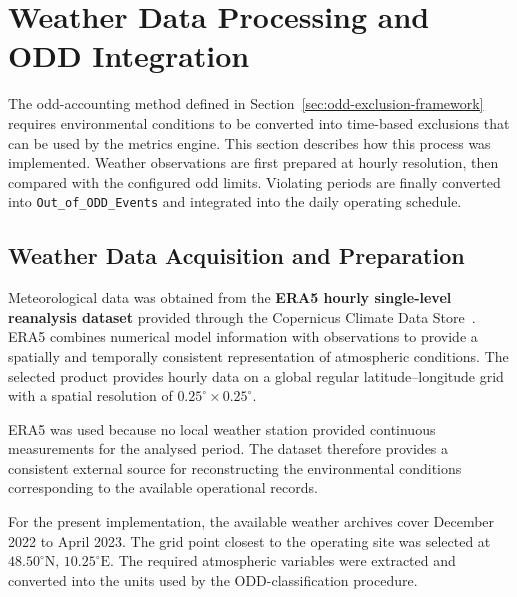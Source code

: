 \section{Weather Data Processing and ODD Integration}
\label{sec:weather-data-processing-and-odd-integration}
The \gls{odd}-accounting method defined in Section~\ref{sec:odd-exclusion-framework} requires environmental conditions to be converted into time-based exclusions that can be used by the metrics engine. This section describes how this process was implemented. Weather observations are first prepared at hourly resolution, then compared with the configured \gls{odd} limits. Violating periods are finally converted into \texttt{Out\_of\_ODD\_Events} and integrated into the daily operating schedule.

\subsection{Weather Data Acquisition and Preparation}
\label{subsec:weather-data-acquisition-and-preparation}
Meteorological data was obtained from the \textbf{ERA5 hourly single-level reanalysis dataset} provided through the Copernicus Climate Data Store~\cite{era5_single_levels_cds}. ERA5 combines numerical model information with observations to provide a spatially and temporally consistent representation of atmospheric conditions. The selected product provides hourly data on a global regular latitude--longitude grid with a spatial resolution of $0.25^\circ \times 0.25^\circ$.

ERA5 was used because no local weather station provided continuous measurements for the analysed period. The dataset therefore provides a consistent external source for reconstructing the environmental conditions corresponding to the available operational records.

For the present implementation, the available weather archives cover December 2022 to April 2023. The grid point closest to the operating site was selected at $48.50^\circ\text{N},\,10.25^\circ\text{E}$. The required atmospheric variables were extracted and converted into the units used by the ODD-classification procedure.


